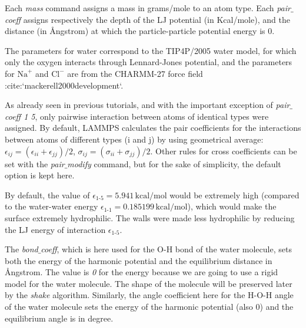 \noindent Each \textit{mass} command assigns a mass in grams/mole to an atom type. Each
\textit{pair$\_$coeff} assigns respectively the depth of the LJ potential
(in Kcal/mole), and the distance (in Ångstrom) at which the
particle-particle potential energy is 0.

\begin{tcolorbox}[colback=mylightblue!5!white,colframe=mylightblue!75!black,title=About the parameters]

\vspace{0.25cm} \noindent The parameters for water
correspond to the TIP4P/2005 water model, for which only 
the oxygen interacts through Lennard-Jones potential, and the parameters
for $\text{Na}^+$ and $\text{Cl}^-$ are
from the CHARMM-27 force field :cite:`mackerell2000development`.
\end{tcolorbox}

\noindent As already seen in previous tutorials, 
and with the important exception of \textit{pair$\_$coeff 1 5},
only pairwise interaction between atoms of
identical types were assigned. By default, LAMMPS calculates
the pair coefficients for the interactions between atoms
of different types (i and j) by using geometrical
average: $\epsilon_{ij} = (\epsilon_{ii} + \epsilon_{jj})/2$, 
$\sigma_{ij} = (\sigma_{ii} + \sigma_{jj})/2.$
Other rules for cross coefficients can be set with the
\textit{pair$\_$modify} command, but for the sake of simplicity,
the default option is kept here.

\vspace{0.25cm} \noindent By default, the value
of $\epsilon_\text{1-5} = 5.941\,\text{kcal/mol}$ would
be extremely high (compared to the water-water
energy $\epsilon_\text{1-1} = 0.185199\,\text{kcal/mol}$),
which would make the surface extremely hydrophilic.
The walls were made less hydrophilic by reducing the 
LJ energy of interaction $\epsilon_\text{1-5}$.

\vspace{0.25cm} \noindent The \textit{bond$\_$coeff}, which is here used for the O-H bond of the water
molecule, sets both the energy of the harmonic
potential and the equilibrium distance in Ångstrom. The
value is \textit{0} for the energy because we are going to use a
rigid model for the water molecule. The shape of the
molecule will be preserved later by the \textit{shake} algorithm.
Similarly, the angle coefficient here for the H-O-H angle
of the water molecule sets the energy of the harmonic
potential (also 0) and the equilibrium angle is in degree.

